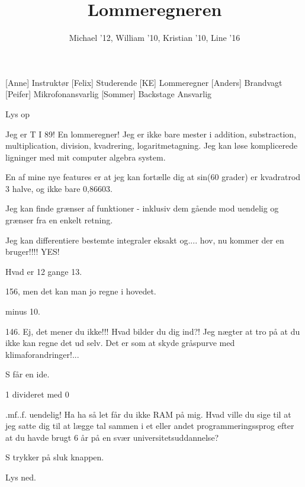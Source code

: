 \documentclass[a4paper,11pt]{article}
\title{Lommeregneren}
\author{Michael '12, William '10, Kristian '10, Line '16}
\begin{document}
\maketitle

\begin{roles}
    [Anne] Instruktør
	[Felix] Studerende
	[KE] Lommeregner
[Anders] Brandvagt
[Peifer] Mikrofonansvarlig
[Sommer] Backstage Ansvarlig
\end{roles}


\begin{sketch}

\scene Lys op

Jeg er T I 89! En lommeregner! Jeg er ikke bare mester i addition, substraction, multiplication, division, kvadrering, logaritmetagning. Jeg kan løse komplicerede ligninger med mit computer algebra system. 

En af mine nye features er at jeg kan fortælle dig at sin(60 grader) er kvadratrod 3 halve, og ikke bare 0,86603. 

Jeg kan finde grænser af funktioner - inklusiv dem gående mod uendelig og grænser fra en enkelt retning.

Jeg kan differentiere bestemte integraler eksakt og.... hov, nu kommer der en bruger!!!! YES!

Hvad er 12 gange 13.

156, men det kan man jo regne i hovedet.

minus 10.

146. Ej, det mener du ikke!!! Hvad bilder du dig ind?! Jeg nægter at tro på at du ikke kan regne det ud selv. Det er som at skyde gråspurve med klimaforandringer!...

\scene S får en ide.

1 divideret med 0

.mf..f. uendelig! Ha ha så let får du ikke RAM på mig. Hvad ville du sige til at jeg satte dig til at lægge tal sammen i et eller andet programmeringssprog efter at du havde brugt 6 år på en svær universitetsuddannelse?

\scene S trykker på sluk knappen.

\scene Lys ned.


\end{sketch}
\end{document}

